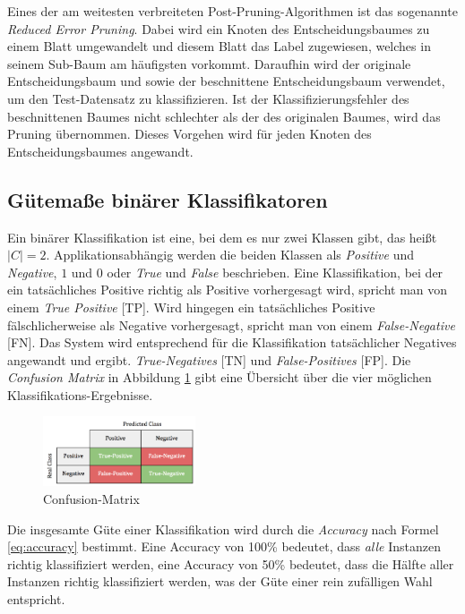 Eines der am weitesten verbreiteten Post-Pruning-Algorithmen ist das sogenannte \emph{Reduced Error Pruning}. Dabei wird ein Knoten des Entscheidungsbaumes zu einem Blatt umgewandelt und diesem Blatt das Label zugewiesen, welches in seinem Sub-Baum am häufigsten vorkommt. Daraufhin wird der originale Entscheidungsbaum und sowie der beschnittene Entscheidungsbaum verwendet, um den Test-Datensatz zu klassifizieren. Ist der Klassifizierungsfehler des beschnittenen Baumes nicht schlechter als der des originalen Baumes, wird das Pruning übernommen. Dieses Vorgehen wird für jeden Knoten des Entscheidungsbaumes angewandt.

\subsection{Gütemaße binärer Klassifikatoren}

Ein binärer Klassifikation ist eine, bei dem es nur zwei Klassen gibt, das heißt $|C| = 2$. Applikationsabhängig werden die beiden Klassen als \emph{Positive} und \emph{Negative}, $1$ und $0$ oder \emph{True} und \emph{False} beschrieben. Eine Klassifikation, bei der ein tatsächliches Positive richtig als Positive vorhergesagt wird, spricht man von einem \emph{True Positive} [TP]. Wird hingegen ein tatsächliches Positive fälschlicherweise als Negative vorhergesagt, spricht man von einem \emph{False-Negative} [FN]. Das System wird entsprechend für die Klassifikation tatsächlicher Negatives angewandt und ergibt. \emph{True-Negatives} [TN] und \emph{False-Positives} [FP]. Die \emph{Confusion Matrix} in Abbildung \ref{img:Confusion-Matrix} gibt eine Übersicht über die vier möglichen Klassifikations-Ergebnisse. \cite[S. 213 - 214]{machine_kubat}

\begin{figure}[h]
	\centering
	\includegraphics[width=0.4\textwidth]{bilder/Confusion-Matrix02.png}
	\caption{Confusion-Matrix}
	\label{img:Confusion-Matrix}
\end{figure}

Die insgesamte Güte einer Klassifikation wird durch die \emph{Accuracy} nach Formel \ref{eq:accuracy} bestimmt. Eine Accuracy von 100\% bedeutet, dass \emph{alle} Instanzen richtig klassifiziert werden, eine Accuracy von 50\% bedeutet, dass die Hälfte aller Instanzen richtig klassifiziert werden, was der Güte einer rein zufälligen Wahl entspricht. \cite[S. 214]{machine_kubat}

